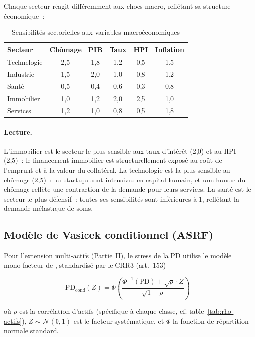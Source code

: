 \documentclass[12pt, a4paper, twoside, openright]{report}
\theoremstyle{definition}
\begin{document}
Chaque secteur réagit différemment aux chocs macro, reflétant sa structure économique~:

\begin{table}[htbp]
\centering
\caption{Sensibilités sectorielles aux variables macroéconomiques}
\label{tab:sensibilites}
\begin{tabular}{lccccc}
\toprule
Secteur & Chômage & PIB & Taux & HPI & Inflation \\
\midrule
Technologie & 2{,}5 & 1{,}8 & 1{,}2 & 0{,}5 & 1{,}5 \\
Industrie & 1{,}5 & 2{,}0 & 1{,}0 & 0{,}8 & 1{,}2 \\
Santé & 0{,}5 & 0{,}4 & 0{,}6 & 0{,}3 & 0{,}8 \\
Immobilier & 1{,}0 & 1{,}2 & 2{,}0 & 2{,}5 & 1{,}0 \\
Services & 1{,}2 & 1{,}0 & 0{,}8 & 0{,}5 & 1{,}8 \\
\bottomrule
\end{tabular}
\end{table}

\paragraph{Lecture.} L'immobilier est le secteur le plus sensible aux taux d'intérêt (2{,}0) et au HPI (2{,}5)~: le financement immobilier est structurellement exposé au coût de l'emprunt et à la valeur du collatéral. La technologie est la plus sensible au chômage (2{,}5)~: les startups sont intensives en capital humain, et une hausse du chômage reflète une contraction de la demande pour leurs services. La santé est le secteur le plus défensif~: toutes ses sensibilités sont inférieures à 1, reflétant la demande inélastique de soins.

\subsection{Modèle de Vasicek conditionnel (ASRF)}

Pour l'extension multi-actifs (Partie~II), le stress de la PD utilise le modèle mono-facteur de \citet{vasicek2002}, standardisé par le CRR3 (art.~153)~:

\begin{equation}
\text{PD}_{\text{cond}}(Z) = \Phi\!\left(\frac{\Phi^{-1}(\text{PD}) + \sqrt{\rho} \cdot Z}{\sqrt{1 - \rho}}\right)
\label{eq:vasicek}
\end{equation}

\noindent où $\rho$ est la corrélation d'actifs (spécifique à chaque classe, cf. table~\ref{tab:rho-actifs}), $Z \sim \mathcal{N}(0,1)$ est le facteur systématique, et $\Phi$ la fonction de répartition normale standard.
\end{document}
